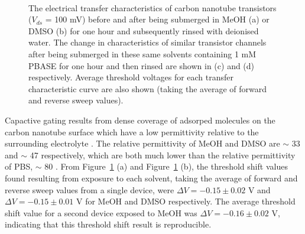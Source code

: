 \documentclass[
  a4paper,
]{scrbook}
\begin{document}
\begin{figure}
\begin{minipage}[t]{0.45\linewidth}
{{}

}

\end{minipage}%
%
\begin{minipage}[t]{0.01\linewidth}

{\centering 

~

}

\end{minipage}%

\caption{\label{fig-PBASE-vs-solvent-only}The electrical transfer
characteristics of carbon nanotube transistors (\(V_{ds}\) = 100 mV)
before and after being submerged in MeOH (a) or DMSO (b) for one hour
and subsequently rinsed with deionised water. The change in
characteristics of similar transistor channels after being submerged in
these same solvents containing 1 mM PBASE for one hour and then rinsed
are shown in (c) and (d) respectively. Average threshold voltages for
each transfer characteristic curve are also shown (taking the average of
forward and reverse sweep values).}

\end{figure}

Capactive gating results from dense coverage of adsorped molecules on
the carbon nanotube surface which have a low permittivity relative to
the surrounding electrolyte \autocite{Heller2008}. The relative
permittivity of MeOH and DMSO are \(\sim\) 33 \autocite{Mohsen-Nia2010}
and \(\sim\) 47 \autocite{Hunger2010} respectively, which are both much
lower than the relative permittivity of PBS, \(\sim\) 80
\autocite{Shkodra2021}. From Figure~\ref{fig-PBASE-vs-solvent-only} (a)
and Figure~\ref{fig-PBASE-vs-solvent-only} (b), the threshold shift
values found resulting from exposure to each solvent, taking the average
of forward and reverse sweep values from a single device, were
\(\Delta V = -0.15 \pm 0.02\) V and \(\Delta V = -0.15 \pm 0.01\) V for
MeOH and DMSO respectively. The average threshold shift value for a
second device exposed to MeOH was \(\Delta V = -0.16 \pm 0.02\) V,
indicating that this threshold shift result is reproducible.
\end{document}
